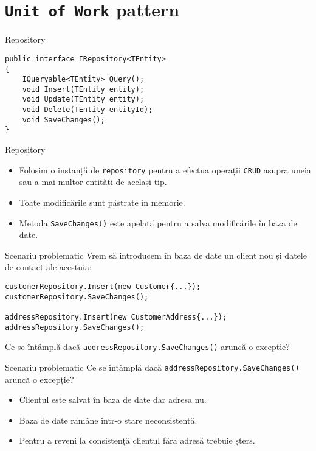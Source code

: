 \documentclass[presentation]{beamer}
\begin{document}
\section{\texttt{Unit of Work} pattern}
\label{sec:org3a889e6}
\begin{frame}[label={sec:org081f1eb},fragile]{Repository}
 \begin{verbatim}
public interface IRepository<TEntity>
{
    IQueryable<TEntity> Query();
    void Insert(TEntity entity);
    void Update(TEntity entity);
    void Delete(TEntity entityId);
    void SaveChanges();
}
\end{verbatim}
\end{frame}
\begin{frame}[label={sec:org87894b6},fragile]{Repository}
 \begin{itemize}
\item Folosim o instanță de \texttt{repository} pentru a efectua operații \texttt{CRUD} asupra uneia sau a mai multor entități de același tip.
\item Toate modificările sunt păstrate în memorie.
\item Metoda \texttt{SaveChanges()} este apelată pentru a salva modificările în baza de date.
\end{itemize}
\end{frame}
\begin{frame}[label={sec:org8f3ae94},fragile]{Scenariu problematic}
 Vrem să introducem în baza de date un client nou și datele de contact ale acestuia:

\begin{verbatim}
customerRepository.Insert(new Customer{...});
customerRepository.SaveChanges();

addressRepository.Insert(new CustomerAddress{...});
addressRepository.SaveChanges();
\end{verbatim}
\pause
Ce se întâmplă dacă \texttt{addressRepository.SaveChanges()} aruncă o excepție?
\end{frame}
\begin{frame}[label={sec:org9ce1c8f},fragile]{Scenariu problematic}
 Ce se întâmplă dacă \texttt{addressRepository.SaveChanges()} aruncă o excepție?
\begin{itemize}
\item Clientul este salvat în baza de date dar adresa nu.
\item Baza de date rămâne într-o stare neconsistentă.
\item Pentru a reveni la consistență clientul fără adresă trebuie șters.
\end{itemize}
\end{frame}
\end{document}
